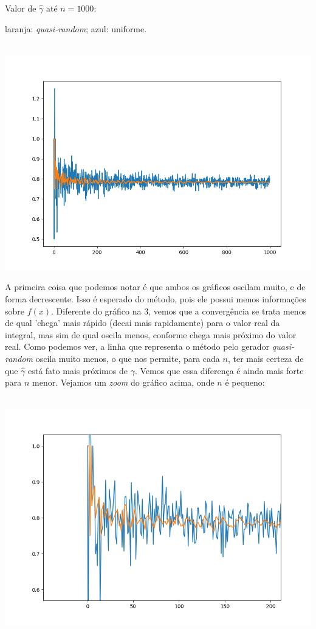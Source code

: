 \documentclass[pt12]{article}
\begin{document}
Valor de $\hat{\gamma}$ até $n=1000$:\\
\indent \begin{small}laranja: \textit{quasi-random}; azul: uniforme.\end{small}\\
\includegraphics[scale=0.7]{conver_hit.png}
\newpage

A primeira coisa que podemos notar é que ambos os gráficos oscilam muito, e de forma decrescente. Isso é esperado do método, pois ele possui menos informações sobre $f(x)$. Diferente do gráfico na 3, vemos que a convergência se trata menos de qual 'chega' mais rápido (decai mais rapidamente) para o valor real da integral, mas sim de qual oscila menos, conforme chega mais próximo do valor real. Como podemos ver, a linha que representa o método pelo gerador \textit{quasi-random} oscila muito menos, o que nos permite, para cada $n$, ter mais certeza de que $\hat{\gamma}$ está fato mais próximos de $\gamma$. Vemos que essa diferença é ainda mais forte para $n$ menor. Vejamos um \textit{zoom} do gráfico acima, onde $n$ é pequeno:\\
\ 

\includegraphics[scale=0.7]{conver_hit_zoom.png}\\
\ 
\end{document}
